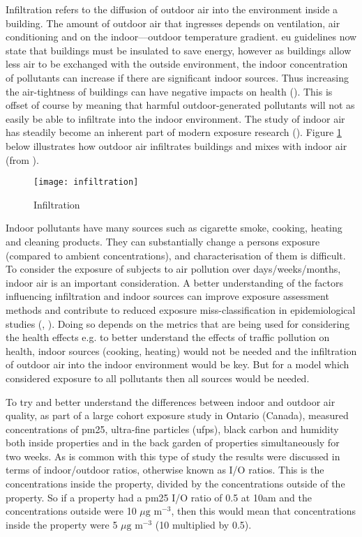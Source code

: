 Infiltration refers to the diffusion of outdoor air into the environment inside a building. The amount of outdoor air that ingresses depends on ventilation, air conditioning and on the indoor--–outdoor temperature gradient. \gls{eu} guidelines now state that buildings must be insulated to save energy, however as buildings allow less air to be exchanged with the outside environment, the indoor concentration of pollutants can increase if there are significant indoor sources. Thus increasing the air-tightness of buildings can have negative impacts on health (\cite{Gens2014}). This is offset of course by meaning that harmful outdoor-generated pollutants will not as easily be able to infiltrate into the indoor environment. The study of indoor air has steadily become an inherent part of modern exposure research (\cite{Steinle2013}). Figure \ref{fig:infiltration} below illustrates how outdoor air infiltrates buildings and mixes with indoor air (from \cite{Chen2011}).

\begin{figure}[H]
\centering
\texttt{[image: infiltration]}
\caption{Infiltration}
\label{fig:infiltration}
\end{figure}

Indoor pollutants have many sources such as cigarette smoke, cooking, heating and cleaning products. They can substantially change a persons exposure (compared to ambient concentrations), and characterisation of them is difficult. To consider the exposure of subjects to air pollution over days/weeks/months, indoor air is an important consideration.  A better understanding of the factors influencing infiltration and indoor sources can improve exposure assessment methods and contribute to reduced exposure miss-classification in epidemiological studies (\cite{Colbeck2010a}, \cite{MacNeill2012}). Doing so depends on the metrics that are being used for considering the health effects e.g. to better understand the effects of traffic pollution on health, indoor sources (cooking, heating) would not be  needed and the infiltration of outdoor air into the indoor environment would be key. But for a model which considered exposure to all pollutants then all sources would be needed.

To try and better understand the differences between indoor and outdoor air quality, as part of a large cohort exposure study in Ontario (Canada), \cite{MacNeill2012} measured concentrations of \gls{pm25}, ultra-fine particles (\gls{ufps}), black carbon and humidity both inside properties and in the back garden of properties simultaneously for two weeks. As is common with this type of study the results were discussed in terms of indoor\slash outdoor ratios, otherwise known as I\slash O ratios. This is the concentrations inside the property, divided by the concentrations outside of the property. So if a property had a \gls{pm25} I\slash O ratio of 0.5 at 10am and the concentrations outside were 10 $\mu \text{g m}^{-3}$, then this would mean that concentrations inside the property were 5 $\mu \text{g m}^{-3}$ (10 multiplied by 0.5).

